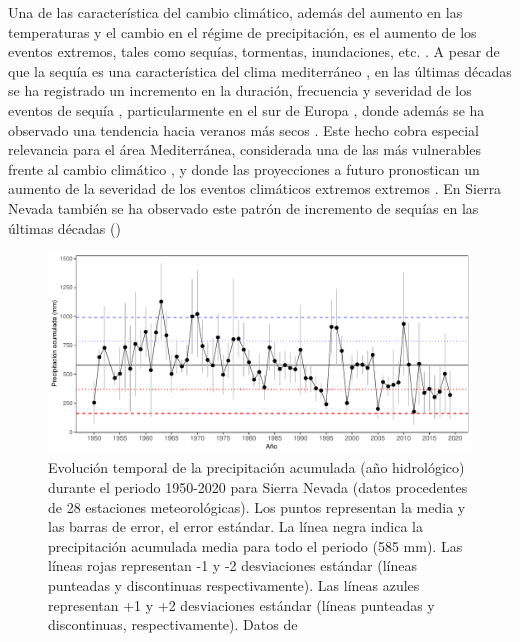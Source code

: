 Una de las característica del cambio climático, además del aumento en las temperaturas y el cambio en el régime de precipitación, es el aumento de los eventos extremos, tales como sequías, tormentas, inundaciones, etc. \autocite{IPCC2013ClimateChange}. A pesar de que la sequía es una característica del clima mediterráneo \autocites{Lionello2012}, en las últimas décadas se ha registrado un incremento en la duración, frecuencia y severidad de los eventos de sequía \autocites{LloydHughesSaunders2002DroughtClimatology, Sousaetal2011TrendsExtremes,Colletal2017DroughtVariability}, particularmente en el sur de Europa \autocites{VicenteSerranoetal2014EvidenceIncreasing,Staggeetal2017ObservedDrought,Spinonietal2015EuropeanDrought,Pascoaetal2017DroughtTrends}, donde además se ha observado una tendencia hacia veranos más secos \autocites{Spinonietal2017PanEuropeanSeasonal}.  Este hecho cobra especial relevancia para el área Mediterránea, considerada una de las más vulnerables frente al cambio climático \autocites{Giorgi2006ClimateChange}, y donde las proyecciones a futuro pronostican un aumento de la severidad de los eventos climáticos extremos extremos \autocites{Hoerlingetal2012IncreasedFrequency,IPCC2013ClimateChange,Trenberthetal2014GlobalWarming,Spinonietal2018WillDrought}. En Sierra Nevada también se ha observado este patrón de incremento de sequías en las últimas décadas ()

\begin{figure}
	\centering
	\includegraphics[width=\textwidth]{img/intro/intro-sequia.pdf} \caption{Evolución temporal de la precipitación acumulada (año hidrológico) durante el periodo 1950-2020 para Sierra Nevada (datos procedentes de 28 estaciones meteorológicas). Los puntos representan la media y las barras de error, el error estándar. La línea negra indica la precipitación acumulada media para todo el periodo (585 mm). Las líneas rojas representan -1 y -2 desviaciones estándar (líneas punteadas y discontinuas respectivamente). Las líneas azules representan +1 y +2 desviaciones estándar (líneas punteadas y discontinuas, respectivamente). Datos de \autocite{PerezLuqueetal2021ClimaNevadaBase}}\label{fig:intro:sequia}
\end{figure}

